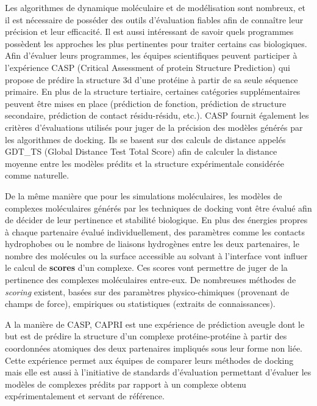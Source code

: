 Les algorithmes de dynamique moléculaire et de modélisation sont nombreux, et il est nécessaire de posséder des outils d'évaluation fiables afin de connaître leur précision et leur efficacité. Il est aussi intéressant de savoir quels programmes possèdent les approches les plus pertinentes pour traiter certains cas biologiques. Afin d'évaluer leurs programmes, les équipes scientifiques peuvent participer à l'expérience CASP (Critical Assessment of protein Structure Prediction) qui propose de prédire la structure 3d d'une protéine à partir de sa seule séquence primaire. En plus de la structure tertiaire, certaines catégories supplémentaires peuvent être mises en place (prédiction de fonction, prédiction de structure secondaire, prédiction de contact résidu-résidu, etc.). CASP fournit également les critères d'évaluations utilisés pour juger de la précision des modèles générés par les algorithmes de docking. Ils se basent sur des calculs de distance appelés GDT\_TS (Global Distance Test Total Score) afin de calculer la distance moyenne entre les modèles prédits et la structure expérimentale considérée comme naturelle. 

De la même manière que pour les simulations moléculaires, les modèles de complexes moléculaires générés par les techniques de docking vont être évalué afin de décider de leur pertinence et stabilité biologique.
En plus des énergies propres à chaque partenaire évalué individuellement, des paramètres comme les contacts hydrophobes ou le nombre de liaisons hydrogènes entre les deux partenaires, le nombre des molécules ou la surface accessible au solvant à l'interface vont influer le calcul de \textbf{scores} d'un complexe. Ces scores vont permettre de juger de la pertinence des complexes moléculaires entre-eux. De nombreuses méthodes de \textit{scoring} existent, basées sur des paramètres physico-chimiques (provenant de champs de force), empiriques ou statistiques (extraits de connaissances).

A la manière de CASP, CAPRI est une expérience de prédiction aveugle dont le but est de prédire la structure d'un complexe protéine-protéine à partir des coordonnées atomiques des deux partenaires impliqués sous leur forme non liée. Cette expérience permet aux équipes de comparer leurs méthodes de docking mais elle est aussi à l'initiative de standards d'évaluation permettant d'évaluer les modèles de complexes prédits par rapport à un complexe obtenu expérimentalement et servant de référence.


